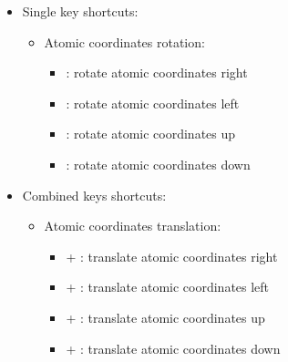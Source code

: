 {\begin{itemize}
\begin{itemize}
\item Single key shortcuts: 
\begin{itemize}
\item Atomic coordinates rotation: 
\begin{itemize}
\item[] \RArrow : rotate atomic coordinates right
\item[] \LArrow : rotate atomic coordinates left
\item[] \UArrow : rotate atomic coordinates up
\item[] \DArrow : rotate atomic coordinates down
\end{itemize}
\end{itemize}
\item Combined keys shortcuts: 
\begin{itemize}
\item Atomic coordinates translation: 
\begin{itemize}
\item[] \Ctrl + \RArrow : translate atomic coordinates right
\item[] \Ctrl + \LArrow : translate atomic coordinates left
\item[] \Ctrl + \UArrow : translate atomic coordinates up
\item[] \Ctrl + \DArrow : translate atomic coordinates down
\end{itemize}
\end{itemize}
\end{itemize}
\end{itemize}}
